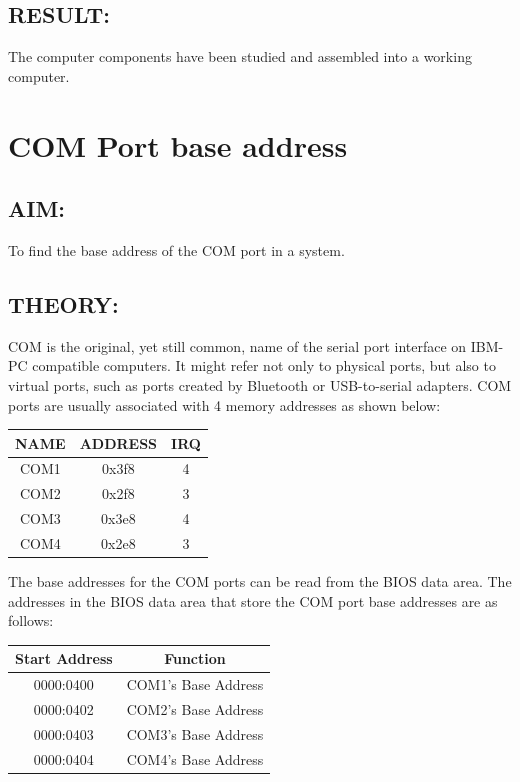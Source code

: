 \documentclass[a4paper,28pt,twoside,openright]{report}
\begin{document}
\section*{RESULT:}
The computer components have been studied and assembled into a working computer.
%
%
%
%
%

\chapter{COM Port base address}
%
%
\section*{AIM:}
To find the base address of the COM port in a system.
\section*{THEORY:}
COM is the original, yet still common, name of the serial port interface on IBM-PC compatible computers. It might refer not only to physical ports, but also to virtual ports, such as ports created by Bluetooth or USB-to-serial adapters. COM ports are usually associated with 4 memory addresses as shown below:

\begin{center}
\bgroup
\def\arraystretch{1.5}
\begin{tabular}{ |c|c|c| }
\hline
\textbf{NAME} & \textbf{ADDRESS} & \textbf{IRQ}\\
\hline
COM1 & 0x3f8 & 4\\
\hline
COM2 & 0x2f8 & 3\\
\hline
COM3 & 0x3e8 & 4\\
\hline
COM4 & 0x2e8 & 3\\
\hline
\end{tabular}
\egroup
\end{center}

The base addresses for the COM ports can be read from the BIOS data area. The addresses in the BIOS data
area that store the COM port base addresses are as follows:

\begin{center}
\bgroup
\def\arraystretch{1.5}
\begin{tabular}{ |c|c| }
\hline
\textbf{Start Address} & \textbf{Function}\\
\hline
0000:0400 & COM1's Base Address\\
\hline
0000:0402 & COM2's Base Address\\
\hline
0000:0403 & COM3's Base Address\\
\hline
0000:0404 & COM4's Base Address\\
\hline
\end{tabular}
\egroup
\end{center}
\end{document}
